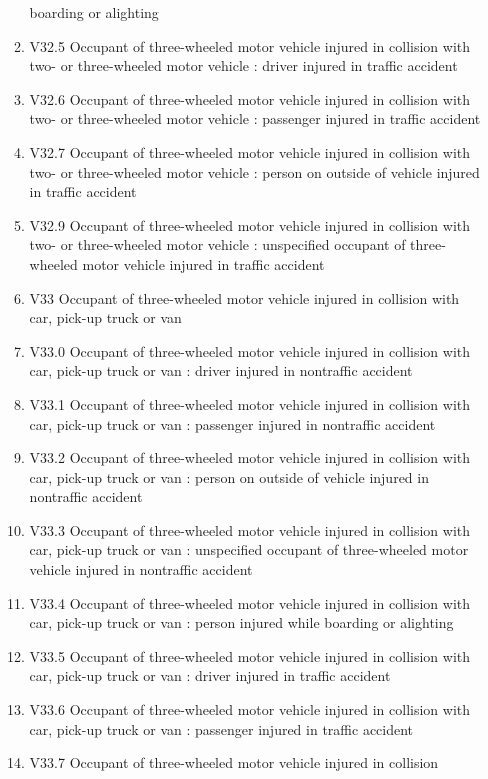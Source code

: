 \documentclass[
]{scrartcl}
\begin{document}
\begin{itemize}
\begin{enumerate}
    boarding or alighting
  \item
    V32.5 Occupant of three-wheeled motor vehicle injured in collision
    with two- or three-wheeled motor vehicle : driver injured in traffic
    accident
  \item
    V32.6 Occupant of three-wheeled motor vehicle injured in collision
    with two- or three-wheeled motor vehicle : passenger injured in
    traffic accident
  \item
    V32.7 Occupant of three-wheeled motor vehicle injured in collision
    with two- or three-wheeled motor vehicle : person on outside of
    vehicle injured in traffic accident
  \item
    V32.9 Occupant of three-wheeled motor vehicle injured in collision
    with two- or three-wheeled motor vehicle : unspecified occupant of
    three-wheeled motor vehicle injured in traffic accident
  \item
    V33 Occupant of three-wheeled motor vehicle injured in collision
    with car, pick-up truck or van
  \item
    V33.0 Occupant of three-wheeled motor vehicle injured in collision
    with car, pick-up truck or van : driver injured in nontraffic
    accident
  \item
    V33.1 Occupant of three-wheeled motor vehicle injured in collision
    with car, pick-up truck or van : passenger injured in nontraffic
    accident
  \item
    V33.2 Occupant of three-wheeled motor vehicle injured in collision
    with car, pick-up truck or van : person on outside of vehicle
    injured in nontraffic accident
  \item
    V33.3 Occupant of three-wheeled motor vehicle injured in collision
    with car, pick-up truck or van : unspecified occupant of
    three-wheeled motor vehicle injured in nontraffic accident
  \item
    V33.4 Occupant of three-wheeled motor vehicle injured in collision
    with car, pick-up truck or van : person injured while boarding or
    alighting
  \item
    V33.5 Occupant of three-wheeled motor vehicle injured in collision
    with car, pick-up truck or van : driver injured in traffic accident
  \item
    V33.6 Occupant of three-wheeled motor vehicle injured in collision
    with car, pick-up truck or van : passenger injured in traffic
    accident
  \item
    V33.7 Occupant of three-wheeled motor vehicle injured in collision

\end{enumerate}
\end{itemize}
\end{document}
